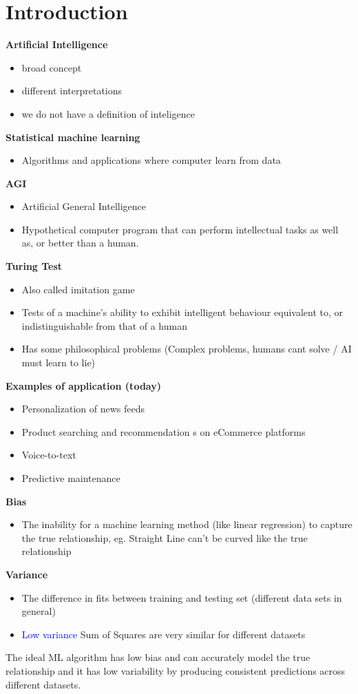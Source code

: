 
\section{Introduction}
\textbf{Artificial Intelligence}
\begin{itemize}
    \item broad concept
    \item different interpretations
    \item we do not have a definition of inteligence
\end{itemize}
\textbf{Statistical machine learning}
\begin{itemize}
    \item Algorithms and applications where computer learn from data
\end{itemize}
\textbf{AGI}
\begin{itemize}
    \item Artificial General Intelligence
    \item Hypothetical computer program that can perform intellectual tasks as well as, or better than a human.
\end{itemize}
\textbf{Turing Test}
\begin{itemize}
    \item Also called imitation game
    \item Tests of a machine's ability to exhibit intelligent behaviour equivalent to, or indistinguishable from that of a human
    \item Has some philosophical problems (Complex problems, humans cant solve / AI must learn to lie)
\end{itemize}
\textbf{Examples of application (today)}
\begin{itemize}
    \item Personalization of news feeds
    \item Product searching and recommendation s on eCommerce platforms
    \item Voice-to-text
    \item Predictive maintenance
\end{itemize}
\textbf{Bias}
\begin{itemize}
    \item The inability for a machine learning method (like linear regression) to capture the true relationship, eg. Straight Line can't be curved like the true relationship
\end{itemize}
\textbf{Variance}
\begin{itemize}
    \item The difference in fits between training and testing set (different data sets in general)
    \item \textcolor{blue}{Low variance} Sum of Squares are very similar for different datasets
\end{itemize}
The ideal ML algorithm has low bias and can accurately model the true relationship and it has low variability by producing consistent predictions across different datasets.


